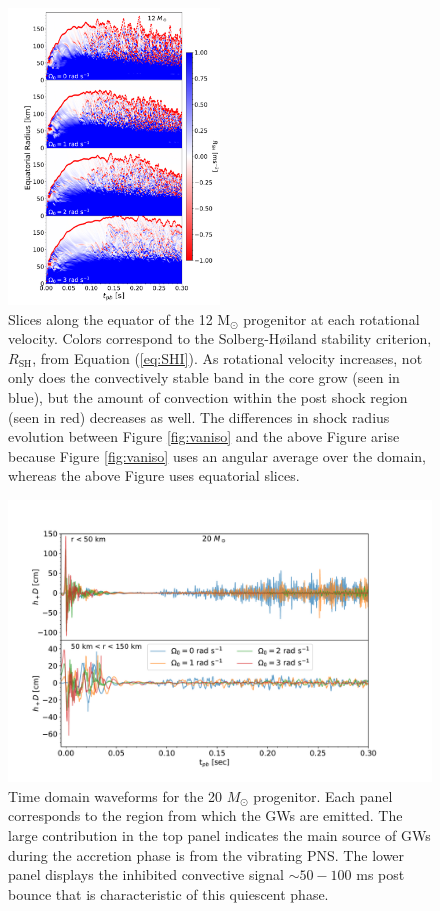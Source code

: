 \documentclass[twocolumn,times]{aastex62}  %
\newcommand{\Msun}{\ensuremath{\mathrm{M}_\odot}\xspace}
\begin{document}
\begin{figure}[]
    \centering
    \includegraphics[width=0.5\textwidth]{SHI_panel_invert.pdf}
    \caption{Slices along the equator of the 12 \Msun progenitor at each rotational velocity.  Colors correspond to the Solberg-H{\o}iland stability criterion, $R_{\mathrm{SH}}$, from Equation (\ref{eq:SHI}).  As rotational velocity increases, not only does the convectively stable band in the core grow (seen in blue), but the amount of convection within the post shock region (seen in red) decreases as well.  The differences in shock radius evolution between Figure \ref{fig:vaniso} and the above Figure arise because Figure \ref{fig:vaniso} uses an angular average over the domain, whereas the above Figure uses equatorial slices.}
    \label{fig:SHI}
\end{figure}

 \begin{figure}[htp]
  \centering     %
  \includegraphics[width=\textwidth]{tdwf_region_20.pdf}
  \caption{Time domain waveforms for the 20 $M_\odot$ progenitor.  Each panel corresponds to the region from which the GWs are emitted.  The large contribution in the top panel indicates the main source of GWs during the accretion phase is from the vibrating PNS.  The lower panel displays the inhibited convective signal $\sim 50-100 $ ms post bounce that is characteristic of this quiescent phase.}
  \label{fig:region}
\end{figure}
\end{document}
